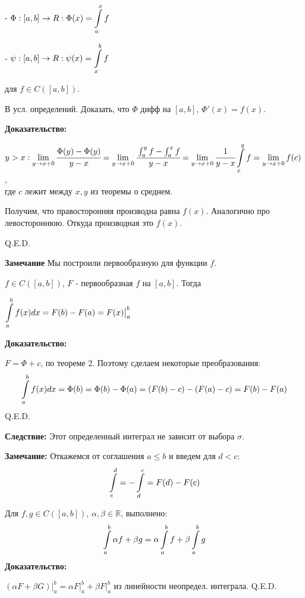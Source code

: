  -  $\Phi:[a,b] \rightarrow R: \Phi(x)= \displaystyle\int\limits_{a}^{x}f$

 -  $\psi:[a,b] \rightarrow R: \psi(x)= \displaystyle\int\limits_{x}^{b}f$

для $f\in C([a,b])$.


В усл. определений. Доказать, что $\Phi$ дифф на $[a,b]$, $\Phi'(x)=f(x)$.

\textbf{Доказательство:}

$y> x: \lim\limits_{y \rightarrow x+0} \cfrac{\Phi(y)-\Phi(y)}{y-x} = \lim\limits_{y \rightarrow x+0} \cfrac{\int_a^y f - \int_a^x f}{y-x} =\lim\limits_{y \rightarrow x+0} \cfrac{1}{y-x} \displaystyle\int\limits_{x}^{y}f =\lim_{y\rightarrow x+0} f(c)$, \\
где $c$ лежит между $x,y$ из теоремы о среднем.

Получим, что правосторонняя производна равна $f(x)$. Аналогично про левостороннюю. Откуда производная это $f(x)$.

 \hfill Q.E.D.
 
\textbf{Замечание} Мы построили первообразную для функции $f$.


$f\in C([a,b])$, $F$ - первообразная $f$ на $[a,b]$. Тогда

$\displaystyle\int\limits_{a}^{b}f(x)dx = F(b)-F(a) = F(x)\big|^b_a$

\textbf{Доказательство:}

$F = \Phi + c$, по теореме 2. Поэтому сделаем некоторые преобразования:
$$\displaystyle\int\limits_{a}^{b}f(x)dx = \Phi(b)= \Phi(b)-\Phi(a) = (F(b)-c)-(F(a)-c)=F(b)-F(a)$$
 \hfill Q.E.D.

 \textbf{Следствие:} Этот определенный интеграл не зависит от выбора $\sigma$. 
 
 \textbf{Замечание:} Откажемся от соглашения $a\leq b$ и введем для $d<c:$
 $$\displaystyle\int\limits_{c}^{d}= - \displaystyle\int\limits_{d}^{c} = F(d) - F(c)$$

 Для $f,g \in C([a,b])$, $\alpha,\beta \in \mathbb{R}$, выполнено:
$$\displaystyle\int\limits_{a}^{b}\alpha f+ \beta g = \alpha \displaystyle\int\limits_{a}^{b}f + \beta\displaystyle\int\limits_{a}^{b}g$$
\textbf{Доказательство:}

$(\alpha F+\beta G)\big|^b_a = \alpha F\big|^b_a + \beta F|^b_a$ из линейности неопредел. интеграла.
 \hfill Q.E.D.


